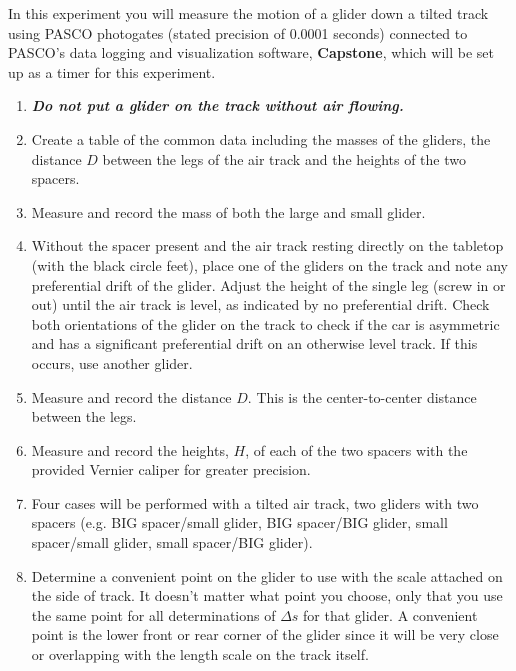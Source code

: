 In this experiment you will measure the motion of a glider down a tilted track using PASCO photogates (stated precision of 0.0001 seconds) connected to PASCO's data logging and visualization software, \textbf{Capstone}, which will be set up as a timer for this experiment. 
\begin{enumerate}
\item %
\textbf{\textit{Do not put a glider on the track without air flowing.}}
\item Create a table of the common data including the masses of the gliders, the distance $D$ between the legs of the air track and the heights of the two spacers.
\item Measure and record the mass of both the large and small glider.
\item Without the spacer present and the air track resting directly on the tabletop (with the black circle feet), place one of the gliders on the track and note any preferential drift of the glider.  Adjust the height of the single leg (screw in or out) until the air track is level, as indicated by no preferential drift.  Check both orientations of the glider on the track to check if the car is asymmetric and has a significant preferential drift on an otherwise level track.  If this occurs, use another glider.
\item Measure and record the distance $D$.  This is the center-to-center distance between the legs.
\item Measure and record the heights, $H$, of each of the two spacers with the provided Vernier caliper for greater precision.
\item Four cases will be performed with a tilted air track, two gliders with two spacers (e.g. BIG spacer/small glider, BIG spacer/BIG glider, small spacer/small glider, small spacer/BIG glider).
\item Determine a convenient point on the glider to use with the scale attached on the side of track.  It doesn't matter what point you choose, only that you use the same point for all determinations of $\Delta s$ for that glider.  A convenient point is the lower front or rear corner of the glider since it will be very close or overlapping with the length scale on the track itself.

\end{enumerate}

